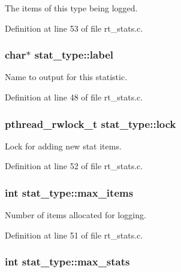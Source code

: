 The items of this type being logged. 



Definition at line 53 of file rt\-\_\-stats.\-c.

\hypertarget{structstat__type_a4859052f95e109f5fef80c48883707c9}{
\subsubsection[{label}]{\setlength{\rightskip}{0pt plus 5cm}char$\ast$ stat\-\_\-type\-::label}}\label{structstat__type_a4859052f95e109f5fef80c48883707c9}


Name to output for this statistic. 



Definition at line 48 of file rt\-\_\-stats.\-c.

\hypertarget{structstat__type_a22f632f9d74f51d3bd8d95a5c8b2536e}{
\subsubsection[{lock}]{\setlength{\rightskip}{0pt plus 5cm}pthread\-\_\-rwlock\-\_\-t stat\-\_\-type\-::lock}}\label{structstat__type_a22f632f9d74f51d3bd8d95a5c8b2536e}


Lock for adding new stat items. 



Definition at line 52 of file rt\-\_\-stats.\-c.

\hypertarget{structstat__type_af697600ffa976b8c4530f7e20e817023}{
\subsubsection[{max\-\_\-items}]{\setlength{\rightskip}{0pt plus 5cm}int stat\-\_\-type\-::max\-\_\-items}}\label{structstat__type_af697600ffa976b8c4530f7e20e817023}


Number of items allocated for logging. 



Definition at line 51 of file rt\-\_\-stats.\-c.

\hypertarget{structstat__type_aa53de19c795fd6100739929a37000248}{
\subsubsection[{max\-\_\-stats}]{\setlength{\rightskip}{0pt plus 5cm}int stat\-\_\-type\-::max\-\_\-stats}}\label{structstat__type_aa53de19c795fd6100739929a37000248}


